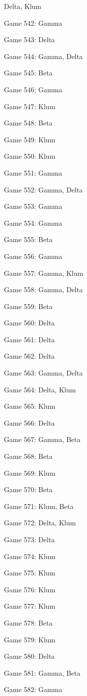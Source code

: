 \documentclass{article}
\begin{document}
\begin{multicols}{3}
\begin{compactitem}
Delta, Klum
\item Game 542:
Gamma
\item Game 543:
Delta
\item Game 544:
Gamma, Delta
\item Game 545:
Beta
\item Game 546:
Gamma
\item Game 547:
Klum
\item Game 548:
Beta
\item Game 549:
Klum
\item Game 550:
Klum
\item Game 551:
Gamma
\item Game 552:
Gamma, Delta
\item Game 553:
Gamma
\item Game 554:
Gamma
\item Game 555:
Beta
\item Game 556:
Gamma
\item Game 557:
Gamma, Klum
\item Game 558:
Gamma, Delta
\item Game 559:
Beta
\item Game 560:
Delta
\item Game 561:
Delta
\item Game 562:
Delta
\item Game 563:
Gamma, Delta
\item Game 564:
Delta, Klum
\item Game 565:
Klum
\item Game 566:
Delta
\item Game 567:
Gamma, Beta
\item Game 568:
Beta
\item Game 569:
Klum
\item Game 570:
Beta
\item Game 571:
Klum, Beta
\item Game 572:
Delta, Klum
\item Game 573:
Delta
\item Game 574:
Klum
\item Game 575:
Klum
\item Game 576:
Klum
\item Game 577:
Klum
\item Game 578:
Beta
\item Game 579:
Klum
\item Game 580:
Delta
\item Game 581:
Gamma, Beta
\item Game 582:
Gamma

\end{compactitem}
\end{multicols}
\end{document}
